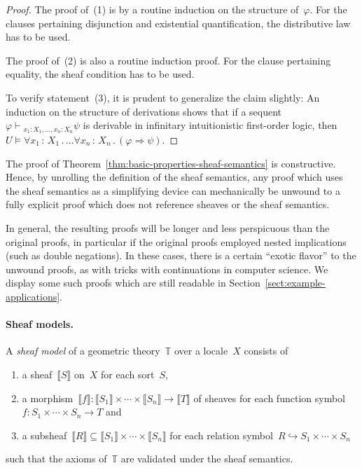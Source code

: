 \documentclass{ws-rv9x6}
\newcommand{\TT}{\mathbb{T}}
\renewcommand{\_}{\mathpunct{.}}
\newcommand{\?}{\,{:}\,}
\newcommand{\seq}[1]{\mathrel{\vdash\!\!\!_{#1}}}
\newcommand{\brak}[1]{{\llbracket{#1}\rrbracket}}
\begin{document}
\begin{proof}The proof of~(1) is by a routine induction on the structure
of~$\varphi$. For the clauses pertaining disjunction and existential
quantification, the distributive law has to be used.

The proof of~(2) is also a routine induction proof. For the clause pertaining
equality, the sheaf condition has to be used.

To verify statement~(3), it is prudent to generalize the claim slightly: An
induction on the structure of derivations shows that if a sequent~$\varphi
\seq{x_1{:}X_1,\ldots,x_n{:}X_n} \psi$ is derivable in infinitary intuitionistic first-order
logic, then~$U \models \forall x_1\?X_1\_ \ldots \forall x_n\?X_n\_ (\varphi
\Rightarrow \psi)$.
\end{proof}

\begin{remark}The proof of Theorem~\ref{thm:basic-properties-sheaf-semantics}
is constructive. Hence, by unrolling the definition of the sheaf semantics, any
proof which uses the sheaf semantics as a simplifying device can mechanically
be unwound to a fully explicit proof which does not reference sheaves or the
sheaf semantics.

In general, the resulting proofs will be longer and less perspicuous
than the original proofs, in particular if the original proofs employed nested
implications (such as double negations). In these cases, there is a certain
``exotic flavor'' to the unwound proofs, as with tricks with continuations in
computer science. We display some such proofs which are still readable in
Section~\ref{sect:example-applications}.
\end{remark}


\paragraph{Sheaf models.}
\begin{definition}\label{defn:sheaf-model}
A \emph{sheaf model} of a geometric theory~$\TT$ over a locale~$X$ consists of
\begin{enumerate}
  \item a sheaf~$\brak{S}$ on~$X$ for each sort~$S$,
  \item a morphism~$\brak{f} : \brak{S_1} \times \cdots \times \brak{S_n} \to
  \brak{T}$ of sheaves for each function symbol~$f : S_1 \times \cdots \times S_n \to T$ and
  \item a subsheaf~$\brak{R} \subseteq \brak{S_1} \times \cdots \times \brak{S_n}$
  for each relation symbol~$R \hookrightarrow S_1 \times \cdots \times S_n$
\end{enumerate}
such that the axioms of~$\TT$ are validated under the sheaf semantics.
\end{definition}
\end{document}
